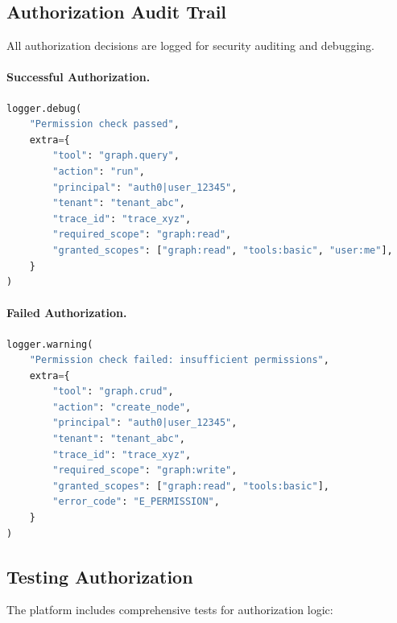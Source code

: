 \subsection{Authorization Audit Trail}
\label{subsec:auth-audit}

All authorization decisions are logged for security auditing and debugging.

\paragraph{Successful Authorization.}
\begin{lstlisting}[language=Python, caption={Audit log for successful authorization}, label={lst:auth-success-log}]
logger.debug(
    "Permission check passed",
    extra={
        "tool": "graph.query",
        "action": "run",
        "principal": "auth0|user_12345",
        "tenant": "tenant_abc",
        "trace_id": "trace_xyz",
        "required_scope": "graph:read",
        "granted_scopes": ["graph:read", "tools:basic", "user:me"],
    }
)
\end{lstlisting}

\paragraph{Failed Authorization.}
\begin{lstlisting}[language=Python, caption={Audit log for failed authorization}, label={lst:auth-failure-log}]
logger.warning(
    "Permission check failed: insufficient permissions",
    extra={
        "tool": "graph.crud",
        "action": "create_node",
        "principal": "auth0|user_12345",
        "tenant": "tenant_abc",
        "trace_id": "trace_xyz",
        "required_scope": "graph:write",
        "granted_scopes": ["graph:read", "tools:basic"],
        "error_code": "E_PERMISSION",
    }
)
\end{lstlisting}

\subsection{Testing Authorization}
\label{subsec:testing-auth}

The platform includes comprehensive tests for authorization logic:

